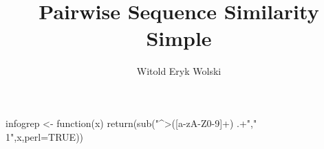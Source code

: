 \documentclass{article}
\title{Pairwise Sequence Similarity Simple}
\author{Witold Eryk Wolski}
\begin{document}
{\makeatletter\gdef\AucTeX@cite#1[#2]#3{[#3#1#2]}\gdef\cite{\@ifnextchar[{\AucTeX@cite{, }}{\AucTeX@cite{}[]}}}

infogrep <- function(x)
  {
    return(sub("^>([a-zA-Z0-9]+) .+","\\1",x,perl=TRUE))
  }

\end{document}
